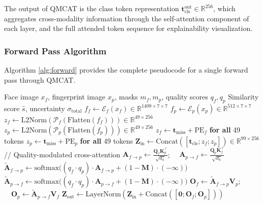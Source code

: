 \documentclass[10pt,journal,compsoc]{IEEEtran}
\begin{document}
The output of QMCAT is the class token representation $\mathbf{t}_{\text{cls}}^{\text{out}} \in \mathbb{R}^{256}$, which aggregates cross-modality information through the self-attention component of each layer, and the full attended token sequence for explainability visualization.

\subsubsection{Forward Pass Algorithm}

Algorithm \ref{alg:forward} provides the complete pseudocode for a single forward pass through QMCAT.

\begin{algorithm}[t]
\caption{UFM-Transformer Forward Pass (QMCAT)}
\label{alg:forward}
\begin{algorithmic}[1]
\Require Face image $x_f$, fingerprint image $x_p$, masks $m_f, m_p$, quality scores $q_f, q_p$
\Ensure Similarity score $\hat{s}$, uncertainty $\sigma_{\text{total}}$
\State $f_f \leftarrow \mathcal{E}_f(x_f) \in \mathbb{R}^{1408 \times 7 \times 7}$
\State $f_p \leftarrow \mathcal{E}_p(x_p) \in \mathbb{R}^{512 \times 7 \times 7}$
\State $z_f \leftarrow \text{L2Norm}(\mathcal{P}_f(\text{Flatten}(f_f))) \in \mathbb{R}^{49 \times 256}$
\State $z_p \leftarrow \text{L2Norm}(\mathcal{P}_p(\text{Flatten}(f_p))) \in \mathbb{R}^{49 \times 256}$
 $z_f \leftarrow \mathbf{t}_{\text{miss}} + \text{PE}_f$ \textbf{for all} 49 tokens \EndIf
{} $z_p \leftarrow \mathbf{t}_{\text{miss}} + \text{PE}_p$ \textbf{for all} 49 tokens \EndIf
\State $\mathbf{Z}_{\text{in}} \leftarrow \text{Concat}([\mathbf{t}_{\text{cls}}; z_f; z_p]) \in \mathbb{R}^{99 \times 256}$
    \State // Quality-modulated cross-attention
    \State $\mathbf{A}_{f \rightarrow p} \leftarrow \frac{\mathbf{Q}_f \mathbf{K}_p^{\top}}{\sqrt{d_h}}$; $\quad \mathbf{A}_{p \rightarrow f} \leftarrow \frac{\mathbf{Q}_p \mathbf{K}_f^{\top}}{\sqrt{d_h}}$
    \State $\tilde{\mathbf{A}}_{f \rightarrow p} \leftarrow \text{softmax}\big((q_f \cdot q_p) \cdot \mathbf{A}_{f \rightarrow p} + (1-\mathbf{M}) \cdot (-\infty)\big)$
    \State $\tilde{\mathbf{A}}_{p \rightarrow f} \leftarrow \text{softmax}\big((q_f \cdot q_p) \cdot \mathbf{A}_{p \rightarrow f} + (1-\mathbf{M}) \cdot (-\infty)\big)$
    \State $\mathbf{O}_f \leftarrow \tilde{\mathbf{A}}_{f \rightarrow p} \mathbf{V}_p$; $\quad \mathbf{O}_p \leftarrow \tilde{\mathbf{A}}_{p \rightarrow f} \mathbf{V}_f$
    \State $\mathbf{Z}_{\text{out}} \leftarrow \text{LayerNorm}(\mathbf{Z}_{\text{in}} + \text{Concat}([\mathbf{0}; \mathbf{O}_f; \mathbf{O}_p]))$

\end{algorithmic}
\end{algorithm}
\end{document}
